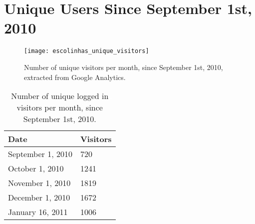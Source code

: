 \chapter{Unique Users Since September 1st, 2010}\label{appendix:unique_visitors}

\begin{figure}[H]
  \texttt{[image: escolinhas\_unique\_visitors]}
  \caption{Number of unique visitors per month, since September 1st, 2010, extracted from Google Analytics.}
  \label{fig:unique_visitors}
\end{figure}

\begin{table}
  \begin{center}
    \begin{tabular}{|l|l|}
      \hline
      \textbf{Date}     & \textbf{Visitors} \\
      \hline
      September 1, 2010 & 720  \\ \hline
      October 1, 2010   & 1241 \\ \hline
      November 1, 2010  & 1819 \\ \hline
      December 1, 2010  & 1672 \\ \hline
      January 16, 2011  & 1006 \\
      \hline
    \end{tabular}
    \caption{Number of unique logged in visitors per month, since September 1st, 2010.}
    \label{table:unique_visitors}
  \end{center}
\end{table}

\vspace{10cm}


